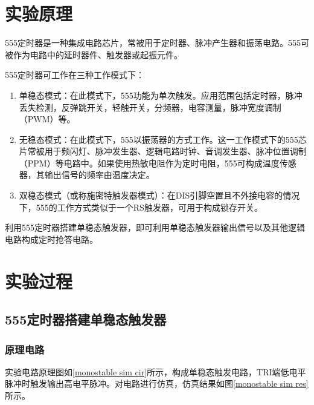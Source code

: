 \documentclass[UTF8]{ctexart}
\numberwithin{figure}{subsection}
\numberwithin{table}{subsection}
\numberwithin{equation}{subsection}
\begin{document}
\section{实验原理}
\par 555定时器是一种集成电路芯片，常被用于定时器、脉冲产生器和振荡电路。555可被作为电路中的延时器件、触发器或起振元件。
\par 555定时器可工作在三种工作模式下：
\begin{enumerate}
    \item 单稳态模式：在此模式下，555功能为单次触发。应用范围包括定时器，脉冲丢失检测，反弹跳开关，轻触开关，分频器，电容测量，脉冲宽度调制（PWM）等。
    \item 无稳态模式：在此模式下，555以振荡器的方式工作。这一工作模式下的555芯片常被用于频闪灯、脉冲发生器、逻辑电路时钟、音调发生器、脉冲位置调制（PPM）等电路中。如果使用热敏电阻作为定时电阻，555可构成温度传感器，其输出信号的频率由温度决定。
    \item 双稳态模式（或称施密特触发器模式）：在DIS引脚空置且不外接电容的情况下，555的工作方式类似于一个RS触发器，可用于构成锁存开关。
\end{enumerate}
\par 利用555定时器搭建单稳态触发器，即可利用单稳态触发器输出信号以及其他逻辑电路构成定时抢答电路。

\section{实验过程}
\subsection{555定时器搭建单稳态触发器}
\subsubsection{原理电路}
\par 实验电路原理图如\ref{monostable sim cir}所示，构成单稳态触发电路，TRI端低电平脉冲时触发输出高电平脉冲。对电路进行仿真，仿真结果如图\ref{monostable sim res}所示。
\end{document}
